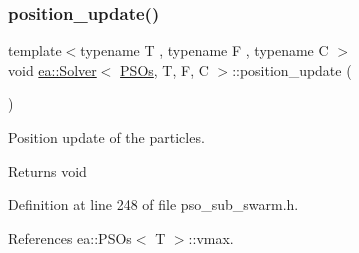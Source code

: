 \subsubsection{\texorpdfstring{position\+\_\+update()}{position\_update()}}
{\footnotesize\ttfamily template$<$typename T , typename F , typename C $>$ \\
void \hyperlink{classea_1_1_solver}{ea\+::\+Solver}$<$ \hyperlink{structea_1_1_p_s_os}{P\+S\+Os}, T, F, C $>$\+::position\+\_\+update (\begin{DoxyParamCaption}{ }\end{DoxyParamCaption})\hspace{0.3cm}{\ttfamily [private]}}



Position update of the particles. 

\begin{DoxyReturn}{Returns}
void 
\end{DoxyReturn}


Definition at line 248 of file pso\+\_\+sub\+\_\+swarm.\+h.



References ea\+::\+P\+S\+Os$<$ T $>$\+::vmax.


